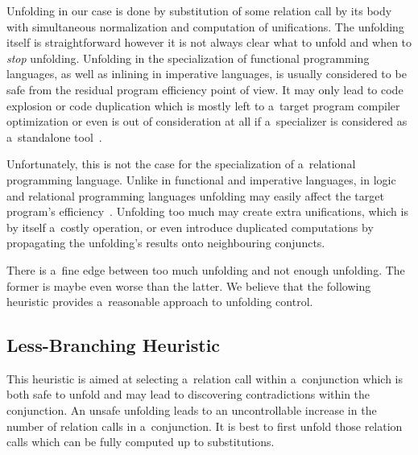 Unfolding in our case is done by substitution of some relation call by its body with simultaneous normalization and computation of unifications.
The unfolding itself is straightforward however it is not always clear what to unfold and when to \emph{stop} unfolding.
Unfolding in the specialization of functional programming languages, as well as inlining in imperative languages, is usually considered to be safe from the residual program efficiency point of view.
It may only lead to code explosion or code duplication which is mostly left to a~target program compiler optimization or even is out of consideration at all if a~specializer is considered as a~standalone tool~\cite{jonesbook}.

Unfortunately, this is not the case for the specialization of a~relational programming language.
Unlike in functional and imperative languages, in logic and relational programming languages unfolding may easily affect the target program's efficiency~\cite{leuschel2002logic}.
Unfolding too much may create extra unifications, which is by itself a~costly operation, or even introduce duplicated computations by propagating the unfolding's results onto neighbouring conjuncts.

There is a~fine edge between too much unfolding and not enough unfolding.
The former is maybe even worse than the latter.
We believe that the following heuristic provides a~reasonable approach to unfolding control.

\subsection{Less-Branching Heuristic}
\label{sec:heurictic}

This heuristic is aimed at selecting a~relation call within a~conjunction which is both safe to unfold and may lead to discovering contradictions within the conjunction.
An unsafe unfolding leads to an uncontrollable increase in the number of relation calls in a~conjunction.
It is best to first unfold those relation calls which can be fully computed up to substitutions.

